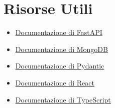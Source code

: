 \documentclass[a4paper, 14pt, oneside]{extbook}
\begin{document}
\section{Risorse Utili}

\begin{itemize}
\item \href{https://fastapi.tiangolo.com/}{Documentazione di FastAPI}
\item \href{https://docs.mongodb.com/}{Documentazione di MongoDB}
\item \href{https://pydantic-docs.helpmanual.io/}{Documentazione di Pydantic}
\item \href{https://reactjs.org/docs/getting-started.html}{Documentazione di React}
\item \href{https://www.typescriptlang.org/docs/}{Documentazione di TypeScript}
\end{itemize}
\end{document}
